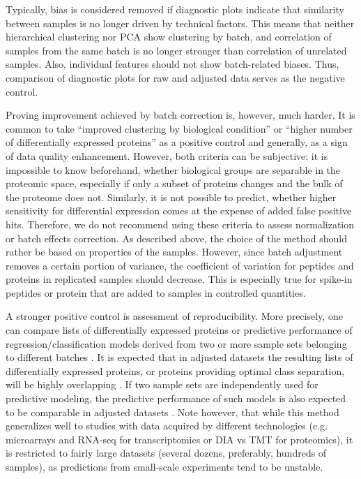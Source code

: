 \documentclass[num-refs]{wiley-article}
\begin{document}
Typically, bias is considered removed if diagnostic plots indicate that similarity between samples is no longer driven by technical factors. This means that neither hierarchical clustering nor PCA show clustering by batch, and correlation of samples from the same batch is no longer stronger than correlation of unrelated samples. Also, individual features should not show batch-related biases. Thus, comparison of diagnostic plots for raw and adjusted data serves as the negative control.

Proving improvement achieved by batch correction is, however, much harder. It is common to take “improved clustering by biological condition” or “higher number of differentially expressed proteins” as a positive control and generally, as a sign of data quality enhancement. However, both criteria can be subjective: it is impossible to know beforehand, whether biological groups are separable in the proteomic space, especially if only a subset of proteins changes and the bulk of the proteome does not. Similarly, it is not possible to predict, whether higher sensitivity for differential expression comes at the expense of added false positive hits. Therefore, we do not recommend using these criteria to assess normalization or batch effects correction. As described above, the choice of the method should rather be based on properties of the samples. However, since batch adjustment removes a certain portion of variance, the coefficient of variation for peptides and proteins in replicated samples should decrease. This is especially true for spike-in peptides or protein that are added to samples in controlled quantities. 

A stronger positive control is assessment of reproducibility. More precisely, one can compare lists of differentially expressed proteins or predictive performance of regression/classification models derived from two or more sample sets belonging to different batches \cite{Lazar:2013aa}. It is expected that in adjusted datasets the resulting lists of differentially expressed proteins, or proteins providing optimal class separation, will be highly overlapping \cite{Shabalin:2008aa}. If two sample sets are independently used for predictive modeling, the predictive performance of such models is also expected to be comparable in adjusted datasets \cite{Luo2010}. Note however, that while this method generalizes well to studies with data acquired by different technologies (e.g. microarrays and RNA-seq for transcriptomics or DIA vs TMT for proteomics), it is restricted to fairly large datasets (several dozens, preferably, hundreds of samples), as predictions from small-scale experiments tend to be unstable.
 
\end{document}
